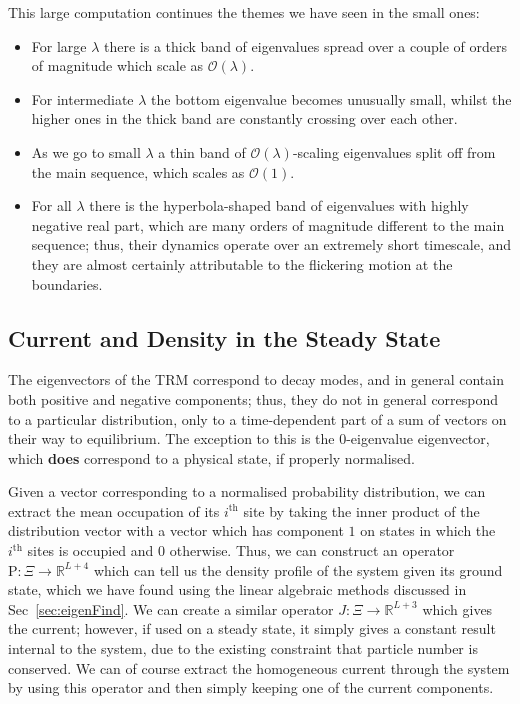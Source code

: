 This large computation continues the themes we have seen in the small ones:
\begin{itemize}
 \item For large $\lambda$ there is a thick band of eigenvalues spread over a couple
 of orders of magnitude which scale as $\mathcal{O}(\lambda)$.
 \item For intermediate $\lambda$ the bottom eigenvalue becomes unusually small, whilst
 the higher ones in the thick band are constantly crossing over each other.
 \item As we go to small $\lambda$ a thin band of $\mathcal{O}(\lambda)$-scaling
 eigenvalues split off from the main sequence, which scales as $\mathcal{O}(1)$.
 \item For all $\lambda$ there is the hyperbola-shaped band of eigenvalues with highly
 negative real part, which are many orders of magnitude different to the main sequence;
 thus, their dynamics operate over an extremely short timescale, and they are almost
 certainly attributable to the flickering motion at the boundaries.
\end{itemize}



\subsection{Current and Density in the Steady State}
The eigenvectors of the TRM correspond to decay modes, and in general contain both 
positive and negative components; thus, they do not in general correspond to a
particular distribution, only to a time-dependent part of a sum of vectors on their
way to equilibrium. The exception to this is the $0$-eigenvalue eigenvector, which
\textbf{does} correspond to a physical state, if properly normalised.

Given a vector corresponding to a normalised probability distribution, we can extract
the mean occupation of its $i^\mathrm{th}$ site by taking the inner product of the
distribution vector with a vector which has component $1$ on states in which the
$i^\mathrm{th}$ sites is occupied and $0$ otherwise. Thus, we can construct an operator
$\mathrm{P} : \Xi \rightarrow \mathbb{R}^{L+4}$ which can tell us the density profile of
the system given its ground state, which we have found using the linear algebraic
methods discussed in Sec~\ref{sec:eigenFind}. We can create a similar operator
$J : \Xi \rightarrow \mathbb{R}^{L+3}$ which gives the current; however, if used on a 
steady state, it simply gives a constant result internal to the system, due to the
existing constraint that particle number is conserved. We can of course extract
the homogeneous current through the system by using this operator and then simply
keeping one of the current components.

